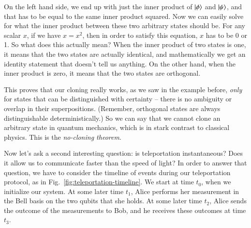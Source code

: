 On the left hand side, we end up with just the inner product of $\left| \phi \right\rangle$ and $\left| \psi \right\rangle$, and that has to be equal to the same inner product squared. Now we can easily solve for what the inner product between these two arbitrary states should be. For any scalar $x$, if we have $x = x^2$, then in order to satisfy this equation, $x$ has to be 0 or 1. So what does this actually mean? When the inner product of two states is one, it means that the two states are actually identical, and mathematically we get an identity statement that doesn't tell us anything. On the other hand, when the inner product is zero, it means that the two states are orthogonal.

This proves that our cloning really works, as we saw in the example before, \emph{only} for states that can be distinguished with certainty -- there is no ambiguity or overlap in their superpositions. (Remember, orthogonal states are always distinguishable deterministically.) So we can say that we cannot clone an arbitrary state in quantum mechanics, which is in stark contrast to classical physics. This is the \emph{no-cloning theorem}.

Now let's ask a second interesting question: is teleportation instantaneous? Does it allow us to communicate faster than the speed of light? In order to answer that question, we have to consider the timeline of events during our teleportation protocol, as in Fig.~\ref{fig:teleportation-timeline}. We start at time $t_0$, when we initialize our system. At some later time $t_1$, Alice performs her measurement in the Bell basis on the two qubits that she holds. At some later time $t_2$, Alice sends the outcome of the measurements to Bob, and he receives these outcomes at time $t_3$.

